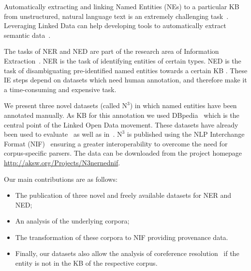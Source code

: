 

Automatically extracting and linking Named Entities (NEs) to a particular \ac{KB}  from unstructured, natural language text is an extremely challenging task~\cite{Cucerzan07}. 
Leveraging Linked Data can help developing tools to automatically extract semantic data~\cite{GER+13,AIDA,spotlight,agdistis_iswc}.

The tasks of \ac{NER}  and \ac{NED}  are part of the research area of Information Extraction~\cite{FOX}.
NER is the task of identifying entities of certain types.
NED is the task of disambiguating pre-identified named entities towards a certain \ac{KB} .
These IE steps depend on datasets which need human annotation, and therefore make it a time-consuming and expensive task.

We present three novel datasets (called $\mbox{N}^3$) in which named entities have been annotated manually. As \ac{KB}  for this annotation we used DBpedia~\cite{dbpedia_iswc} which is the central point of the Linked Open Data movement. These datasets have already been used to evaluate~\cite{AIDA,spotlight} as well as in~\cite{GER+13,agdistis_iswc,GERBIL}.
$\mbox{N}^3$ is published using the \ac{NLP} Interchange Format (NIF)~\cite{ISWC2013NIF} ensuring a greater interoperability to overcome the need for corpus-specific parsers. 
The data can be downloaded from the project homepage \url{http://aksw.org/Projects/N3nernednif}.

Our main contributions are as follows:
\begin{itemize}
\item The publication of three novel and freely available datasets for \ac{NER} and \ac{NED};
\item An analysis of the underlying corpora;
\item The transformation of these corpora to NIF providing provenance data.
\item Finally, our datasets also allow the analysis of coreference resolution~\cite{NgongaNgomo2014,singh} if the entity is not in the \ac{KB}  of the respective corpus.
\end{itemize}

